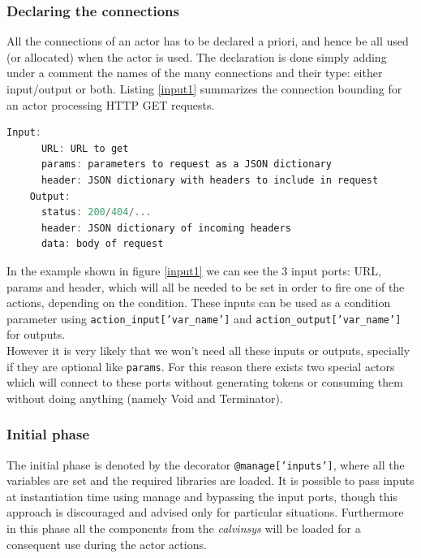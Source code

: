 \subsubsection{Declaring the connections}

All the connections of an actor has to be declared a priori, and hence be all used (or allocated)
when the actor is used. The declaration is done simply adding under a comment the names of the many connections
and their type: either input/output or both.
Listing \ref{input1} summarizes the connection bounding for an actor processing HTTP GET requests.

\begin{lstlisting}[language=C,frame=single,caption=Example of connection bounding,label=input1]
    Input:
      URL: URL to get
      params: parameters to request as a JSON dictionary
      header: JSON dictionary with headers to include in request
    Output:
      status: 200/404/...
      header: JSON dictionary of incoming headers
      data: body of request
\end{lstlisting}

In the example shown in figure \ref{input1} we can see the 3 input ports: URL, params and header, which will all be needed to be set
in order to fire one of the actions, depending on the condition. These inputs can be used
as a condition parameter using \newline \texttt{action\_input['var\_name']} and \texttt{action\_output['var\_name']}
for outputs.\\
However it is very likely that we won't need all these inputs or outputs, specially if they are optional
like \texttt{params}. For this reason there exists two special actors which will connect to these
ports without generating tokens or consuming them without doing anything (namely Void and Terminator).

\subsubsection{Initial phase}

The initial phase is denoted by the decorator \texttt{@manage['inputs']}, where all the variables
are set and the required libraries are loaded. It is possible to pass inputs at instantiation
time using manage and bypassing the input ports, though this approach is discouraged and
advised only for particular situations. Furthermore in this phase all the components
from the \textit{calvinsys} will be loaded for a consequent use during the actor actions.

